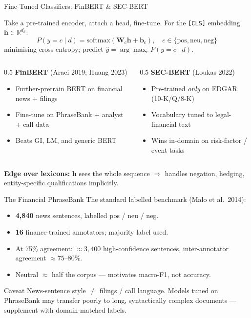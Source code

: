 \documentclass[9pt,t]{beamer}
\begin{document}
\begin{frame}{Fine-Tuned Classifiers: FinBERT \& SEC-BERT}
\begin{underhood}
Take a pre-trained encoder, attach a head, fine-tune. For the \texttt{[CLS]}
embedding $\mathbf{h}\in\mathbb{R}^{d_h}$:
\[
P(y=c\mid d)=\mathrm{softmax}(\mathbf{W}_c\mathbf{h}+\mathbf{b}_c),
\quad c\in\{\text{pos},\text{neu},\text{neg}\}
\]
minimising cross-entropy; predict $\hat{y}=\arg\max_c P(y=c\mid d)$.
\end{underhood}

\medskip
\begin{columns}[T]
\begin{column}{0.5\textwidth}
\textbf{FinBERT} (Araci 2019; Huang 2023)
\begin{itemize}\footnotesize
  \item Further-pretrain BERT on financial news + filings
  \item Fine-tune on PhraseBank + analyst + call data
  \item Beats GI, LM, and generic BERT
\end{itemize}
\end{column}
\begin{column}{0.5\textwidth}
\textbf{SEC-BERT} (Loukas 2022)
\begin{itemize}\footnotesize
  \item Pre-trained \emph{only} on EDGAR (10-K/Q/8-K)
  \item Vocabulary tuned to legal-financial text
  \item Wins in-domain on risk-factor / event tasks
\end{itemize}
\end{column}
\end{columns}

\medskip
\textbf{Edge over lexicons:} $\mathbf{h}$ sees the whole sequence $\Rightarrow$
handles negation, hedging, entity-specific qualifications implicitly.
\end{frame}

\begin{frame}{The Financial PhraseBank}
The standard labelled benchmark (Malo et al.\ 2014):
\begin{itemize}
  \item \textbf{4{,}840} news sentences, labelled pos / neu / neg.
  \item \textbf{16} finance-trained annotators; majority label used.
  \item At 75\% agreement: $\approx 3{,}400$ high-confidence sentences,
        inter-annotator agreement $\approx 75$--$80\%$.
  \item \alert{Neutral $\approx$ half the corpus} --- motivates macro-F1, not accuracy.
\end{itemize}

\medskip
\begin{block}{Caveat}
News-sentence style $\neq$ filings / call language. Models tuned on PhraseBank
may transfer poorly to long, syntactically complex documents --- supplement
with domain-matched labels.
\end{block}
\end{frame}
\end{document}
